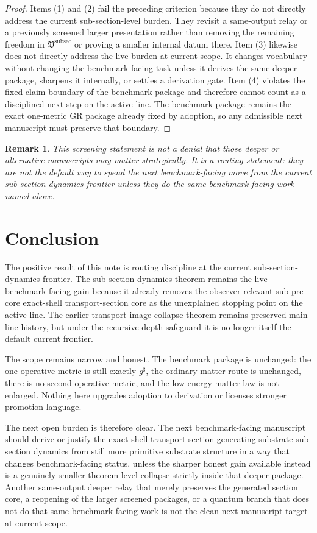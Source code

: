 \documentclass[11pt]{article}
\newcommand{\CompletedMetric}{g^{\sharp}}
\newcommand{\SubSectionPackage}{\mathfrak V^{\mathrm{subsec}}}
\newtheorem{remark}{Remark}
\begin{document}
\begin{proof}
Items (1) and (2) fail the preceding criterion because they do not directly address the current sub-section-level burden. They revisit a same-output relay or a previously screened larger presentation rather than removing the remaining freedom in \(\SubSectionPackage\) or proving a smaller internal datum there. Item (3) likewise does not directly address the live burden at current scope. It changes vocabulary without changing the benchmark-facing task unless it derives the same deeper package, sharpens it internally, or settles a derivation gate. Item (4) violates the fixed claim boundary of the benchmark package and therefore cannot count as a disciplined next step on the active line. The benchmark package remains the exact one-metric GR package already fixed by adoption, so any admissible next manuscript must preserve that boundary.
\end{proof}

\begin{remark}
This screening statement is not a denial that those deeper or alternative manuscripts may matter strategically. It is a routing statement: they are not the default way to spend the next benchmark-facing move from the current sub-section-dynamics frontier unless they do the same benchmark-facing work named above.
\end{remark}

\section{Conclusion}

The positive result of this note is routing discipline at the current sub-section-dynamics frontier. The sub-section-dynamics theorem remains the live benchmark-facing gain because it already removes the observer-relevant sub-pre-core exact-shell transport-section core as the unexplained stopping point on the active line. The earlier transport-image collapse theorem remains preserved main-line history, but under the recursive-depth safeguard it is no longer itself the default current frontier.

The scope remains narrow and honest. The benchmark package is unchanged: the one operative metric is still exactly \(\CompletedMetric\), the ordinary matter route is unchanged, there is no second operative metric, and the low-energy matter law is not enlarged. Nothing here upgrades adoption to derivation or licenses stronger promotion language.

The next open burden is therefore clear. The next benchmark-facing manuscript should derive or justify the exact-shell-transport-section-generating substrate sub-section dynamics from still more primitive substrate structure in a way that changes benchmark-facing status, unless the sharper honest gain available instead is a genuinely smaller theorem-level collapse strictly inside that deeper package. Another same-output deeper relay that merely preserves the generated section core, a reopening of the larger screened packages, or a quantum branch that does not do that same benchmark-facing work is not the clean next manuscript target at current scope.
\end{document}
